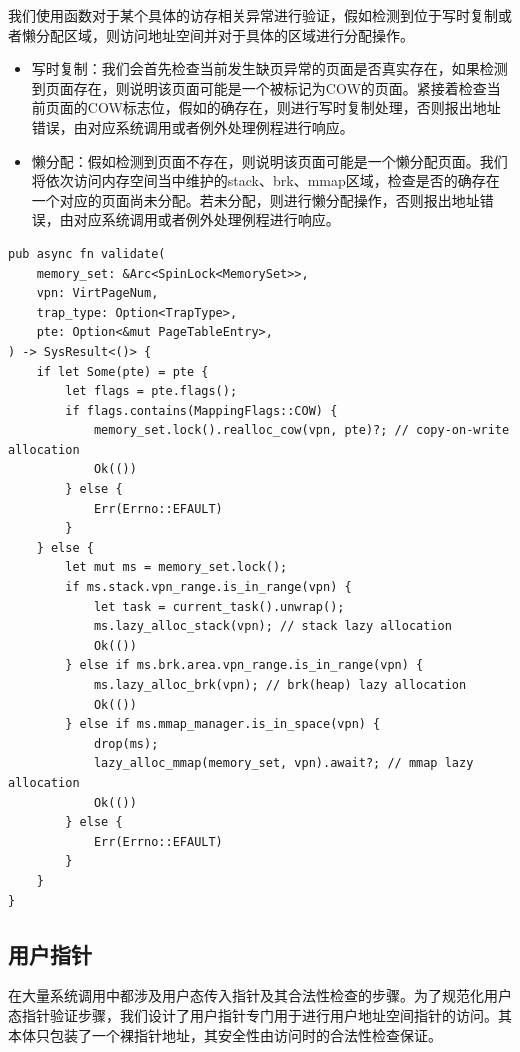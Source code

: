 \documentclass{article}
\begin{document}
我们使用函数对于某个具体的访存相关异常进行验证，假如检测到位于写时复制或者懒分配区域，则访问地址空间并对于具体的区域进行分配操作。

\begin{itemize}
    \item 写时复制：我们会首先检查当前发生缺页异常的页面是否真实存在，如果检测到页面存在，则说明该页面可能是一个被标记为COW的页面。紧接着检查当前页面的COW标志位，假如的确存在，则进行写时复制处理，否则报出地址错误，由对应系统调用或者例外处理例程进行响应。
    \item 懒分配：假如检测到页面不存在，则说明该页面可能是一个懒分配页面。我们将依次访问内存空间当中维护的stack、brk、mmap区域，检查是否的确存在一个对应的页面尚未分配。若未分配，则进行懒分配操作，否则报出地址错误，由对应系统调用或者例外处理例程进行响应。
\end{itemize}

\begin{lstlisting}
pub async fn validate(
    memory_set: &Arc<SpinLock<MemorySet>>,
    vpn: VirtPageNum,
    trap_type: Option<TrapType>,
    pte: Option<&mut PageTableEntry>,
) -> SysResult<()> {
    if let Some(pte) = pte {
        let flags = pte.flags();
        if flags.contains(MappingFlags::COW) {
            memory_set.lock().realloc_cow(vpn, pte)?; // copy-on-write allocation
            Ok(())
        } else {
            Err(Errno::EFAULT)
        }
    } else {
        let mut ms = memory_set.lock();
        if ms.stack.vpn_range.is_in_range(vpn) {
            let task = current_task().unwrap();
            ms.lazy_alloc_stack(vpn); // stack lazy allocation
            Ok(())
        } else if ms.brk.area.vpn_range.is_in_range(vpn) {
            ms.lazy_alloc_brk(vpn); // brk(heap) lazy allocation
            Ok(())
        } else if ms.mmap_manager.is_in_space(vpn) {
            drop(ms);
            lazy_alloc_mmap(memory_set, vpn).await?; // mmap lazy allocation
            Ok(())
        } else {
            Err(Errno::EFAULT)
        }
    }
}
\end{lstlisting}

\subsection{用户指针}

在大量系统调用中都涉及用户态传入指针及其合法性检查的步骤。为了规范化用户态指针验证步骤，我们设计了用户指针专门用于进行用户地址空间指针的访问。其本体只包装了一个裸指针地址，其安全性由访问时的合法性检查保证。
\end{document}
